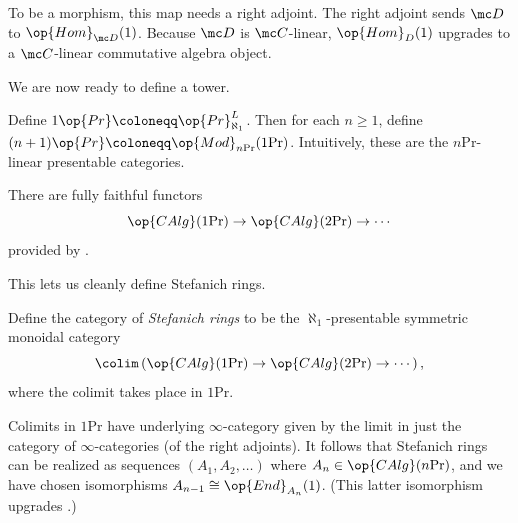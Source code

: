 \documentclass[../notes.tex]{subfiles}
\begin{document}
\begin{remark} \label{rem:upgrade-pr}
	To be a morphism, this map needs a right adjoint. The right adjoint sends $\mc D$ to $\op{Hom}_{\mc D}(1)$. Because $\mc D$ is $\mc C$-linear, $\op{Hom}_D(1)$ upgrades to a $\mc C$-linear commutative algebra object.
\end{remark}
We are now ready to define a tower.
\begin{definition}
	Define $1\op{Pr}\coloneqq\op{Pr}^L_{\aleph_1}$. Then for each $n\ge1$, define $(n+1)\op{Pr}\coloneqq\op{Mod}_{n\mathrm{Pr}}(1\mathrm{Pr})$. Intuitively, these are the $n\mathrm{Pr}$-linear presentable categories.
\end{definition}
\begin{remark}
	There are fully faithful functors
	\[\op{CAlg}(1\mathrm{Pr})\to\op{CAlg}(2\mathrm{Pr})\to\cdots\]
	provided by .
\end{remark}
This lets us cleanly define Stefanich rings.
\begin{definition}
	Define the category of \textit{Stefanich rings} to be the $\aleph_1$-presentable symmetric monoidal category
	\[\colim\left(\op{CAlg}(1\mathrm{Pr})\to\op{CAlg}(2\mathrm{Pr})\to\cdots\right),\]
	where the colimit takes place in $1\mathrm{Pr}$.
\end{definition}
\begin{remark}
	Colimits in $1\mathrm{Pr}$ have underlying $\infty$-category given by the limit in just the category of $\infty$-categories (of the right adjoints). It follows that Stefanich rings can be realized as sequences $(A_1,A_2,\ldots)$ where $A_n\in\op{CAlg}(n\mathrm{Pr})$, and we have chosen isomorphisms $A_{n-1}\cong\op{End}_{A_n}(1)$. (This latter isomorphism upgrades .)
\end{remark}
\end{document}
